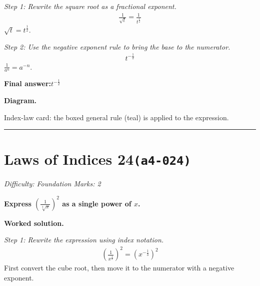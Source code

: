 \documentclass[11pt]{article}
\newcommand{\question}[1]{\par\medskip\noindent\textbf{#1}\par}
\begin{document}
\textit{Step 1: Rewrite the square root as a fractional exponent.}
\[\begin{gathered}
\frac{1}{\sqrt{t}} = \frac{1}{t^{\frac{1}{2}}}
\end{gathered}\]
\( \sqrt{t} = t^{\frac{1}{2}} \).

\textit{Step 2: Use the negative exponent rule to bring the base to the numerator.}
\[\begin{gathered}
t^{-\frac{1}{2}}
\end{gathered}\]
\( \frac{1}{a^n} = a^{-n} \).

\begin{answerbox}
\textbf{Final answer:}\quad \(\displaystyle t^{-\frac{1}{2}}\)
\end{answerbox}
\textbf{Diagram.}

\begin{center}
\end{center}
\small Index-law card: the boxed general rule (teal) is applied to the expression.\normalsize

\medskip\hrule

\section*{Laws of Indices 24\quad\small\texttt{(a4-024)}}
\textit{Difficulty: Foundation \quad\textbar\quad Marks: 2}

\question{Express \( \left(\frac{1}{\sqrt[3]{x}}\right)^2 \) as a single power of \( x \).}

\textbf{Worked solution.}

\textit{Step 1: Rewrite the expression using index notation.}
\[\begin{gathered}
\left(\frac{1}{x^{\frac{1}{3}}}\right)^2 = \left(x^{-\frac{1}{3}}\right)^2
\end{gathered}\]
First convert the cube root, then move it to the numerator with a negative exponent.
\end{document}
